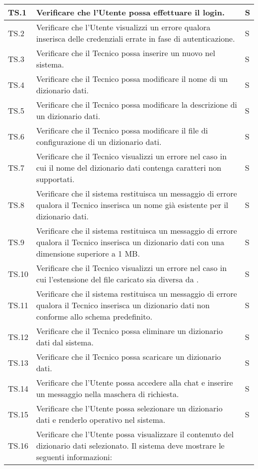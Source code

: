 \begin{adjustwidth}{-0.5cm}{-0.5cm}
\begin{longtable}{|P{1.5cm}|>{\raggedright}P{9.5cm}|>{\arraybackslash}P{1.5cm}|}
		TS.1 & Verificare che l'Utente possa effettuare il login. & S \\
		\hline TS.2 & Verificare che l'Utente visualizzi un errore qualora inserisca delle credenziali errate in fase di autenticazione. & S \\
		\hline TS.3 & Verificare che il Tecnico possa inserire un nuovo  nel sistema. & S \\ 
		\hline TS.4 & Verificare che il Tecnico possa modificare il nome di un dizionario dati. & S \\ 
		\hline TS.5 & Verificare che il Tecnico possa modificare la descrizione di un dizionario dati. & S \\
		\hline TS.6 & Verificare che il Tecnico possa modificare il file di configurazione di un dizionario dati. & S \\
		\hline TS.7 & Verificare che il Tecnico visualizzi un errore nel caso in cui il nome del dizionario dati contenga caratteri non supportati. & S \\ 
		\hline TS.8 & Verificare che il sistema restituisca un messaggio di errore qualora il Tecnico inserisca un nome già esistente per il dizionario dati. & S \\ 
		\hline TS.9 & Verificare che il sistema restituisca un messaggio di errore qualora il Tecnico inserisca un dizionario dati con una dimensione superiore a 1 MB. & S \\
		\hline TS.10 & Verificare che il Tecnico visualizzi un errore nel caso in cui l'estensione del file caricato sia diversa da . & S \\ 
		\hline TS.11 & Verificare che il sistema restituisca un messaggio di errore qualora il Tecnico inserisca un dizionario dati non conforme allo schema predefinito. & S \\  
		\hline TS.12 & Verificare che il Tecnico possa eliminare un dizionario dati dal sistema. & S \\   
		\hline TS.13 & Verificare che il Tecnico possa scaricare un dizionario dati. & S \\
		\hline TS.14 & Verificare che l'Utente possa accedere alla chat e inserire un messaggio nella maschera di richiesta. & S \\   
		\hline TS.15 & Verificare che l'Utente possa selezionare un dizionario dati e renderlo operativo nel sistema. & S \\ 
		\hline TS.16 & Verificare che l'Utente possa visualizzare il contenuto del dizionario dati selezionato. Il sistema deve mostrare le seguenti informazioni:

\end{longtable}
\end{adjustwidth}
